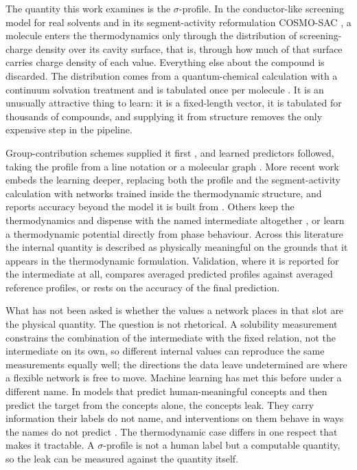 The quantity this work examines is the $\sigma$-profile. In the conductor-like screening model for
real solvents and in its segment-activity reformulation COSMO-SAC \cite{lin2002}, a molecule enters
the thermodynamics only through the distribution of screening-charge density over its cavity
surface, that is, through how much of that surface carries charge density of each value. Everything
else about the compound is discarded. The distribution comes from a quantum-chemical calculation
with a continuum solvation treatment and is tabulated once per molecule \cite{mullins2006}. It is
an unusually attractive thing to learn: it is a fixed-length vector, it is tabulated for thousands
of compounds, and supplying it from structure removes the only expensive step in the pipeline.

Group-contribution schemes supplied it first \cite{mu2007gc,mu2009gc}, and learned predictors
followed, taking the profile from a line notation or a molecular graph
\cite{kang2022surrogate,chen2021transformer,zhang2022mpnn}. More recent work embeds the learning
deeper, replacing both the profile and the segment-activity calculation with networks trained
inside the thermodynamic structure, and reports accuracy beyond the model it is built from
\cite{yang2025tennet}. Others keep the thermodynamics and dispense with the named intermediate
altogether \cite{specht2024hanna}, or learn a thermodynamic potential directly from phase
behaviour. Across this literature the internal quantity is described as physically meaningful on
the grounds that it appears in the thermodynamic formulation. Validation, where it is reported for
the intermediate at all, compares averaged predicted profiles against averaged reference profiles,
or rests on the accuracy of the final prediction.

What has not been asked is whether the values a network places in that slot are the physical
quantity. The question is not rhetorical. A solubility measurement constrains the combination of
the intermediate with the fixed relation, not the intermediate on its own, so different internal
values can reproduce the same measurements equally well; the directions the data leave undetermined
are where a flexible network is free to move. Machine learning has met this before under a different name. In models that predict human-meaningful concepts and then predict the target from the concepts alone, the concepts leak. They carry information their labels do not name, and interventions on them behave in ways the names do not predict
\cite{koh2020cbm,margeloiu2021,mahinpei2021,havasi2022}. The thermodynamic case differs in one
respect that makes it tractable. A $\sigma$-profile is not a human label but a computable quantity,
so the leak can be measured against the quantity itself.

